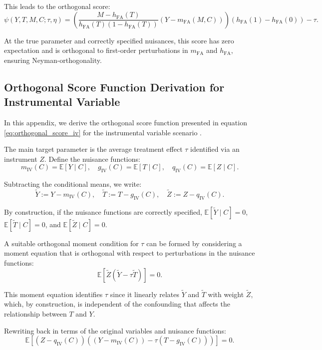 \documentclass{article}
\numberwithin{equation}{section}
\begin{document}
This leads to the orthogonal score:
\[
\psi(Y, T, M, C; \tau, \eta) 
= \left(\frac{M - h_{\text{FA}}(T)}{h_{\text{FA}}(T)(1 - h_{\text{FA}}(T))}(Y - m_{\text{FA}}(M, C))\right)(h_{\text{FA}}(1) - h_{\text{FA}}(0)) - \tau.
\]

At the true parameter and correctly specified nuisances, this score has zero expectation and is orthogonal to first-order perturbations in \(m_{\text{FA}}\) and \(h_{\text{FA}}\), ensuring Neyman-orthogonality.

\newpage
\subsection{Orthogonal Score Function Derivation for Instrumental Variable}
\label{subsec:appendix_orthogonal_score_function_instrumental_variable}

In this appendix, we derive the orthogonal score function presented in equation \eqref{eq:orthogonal_score_iv} for the instrumental variable scenario \cite{BelloniChernozhukovHansen2014, ChernozhukovChetverikovDemireretal2018, Pearl2009}.

The main target parameter is the average treatment effect \(\tau\) identified via an instrument \(Z\). Define the nuisance functions:
\[
m_{\text{IV}}(C) = \mathbb{E}[Y \mid C], \quad
g_{\text{IV}}(C) = \mathbb{E}[T \mid C], \quad
q_{\text{IV}}(C) = \mathbb{E}[Z \mid C].
\]

Subtracting the conditional means, we write:
\[
\tilde{Y} := Y - m_{\text{IV}}(C), \quad
\tilde{T} := T - g_{\text{IV}}(C), \quad
\tilde{Z} := Z - q_{\text{IV}}(C).
\]

By construction, if the nuisance functions are correctly specified, \(\mathbb{E}[\tilde{Y} \mid C] = 0\), \(\mathbb{E}[\tilde{T} \mid C] = 0\), and \(\mathbb{E}[\tilde{Z} \mid C] = 0\).

A suitable orthogonal moment condition for \(\tau\) can be formed by considering a moment equation that is orthogonal with respect to perturbations in the nuisance functions:
\[
\mathbb{E}[\tilde{Z}(\tilde{Y} - \tau \tilde{T})] = 0.
\]

This moment equation identifies \(\tau\) since it linearly relates \(\tilde{Y}\) and \(\tilde{T}\) with weight \(\tilde{Z}\), which, by construction, is independent of the confounding that affects the relationship between \(T\) and \(Y\).

Rewriting back in terms of the original variables and nuisance functions:
\[
\mathbb{E}[(Z - q_{\text{IV}}(C))((Y - m_{\text{IV}}(C)) - \tau (T - g_{\text{IV}}(C)))] = 0.
\]
\end{document}
